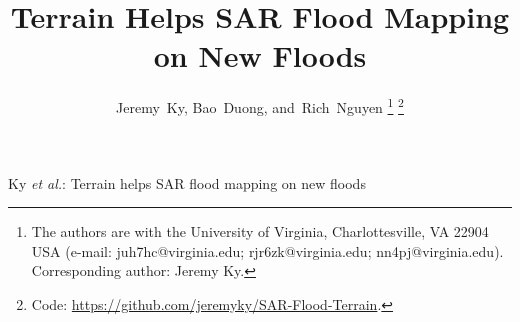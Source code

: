 \documentclass[journal]{IEEEtran}
\begin{document}

\title{Terrain Helps SAR Flood Mapping on New Floods}

\author{Jeremy~Ky, Bao~Duong, and~Rich~Nguyen%
\thanks{The authors are with the University of Virginia, Charlottesville, VA 22904 USA (e-mail:
juh7hc@virginia.edu; rjr6zk@virginia.edu; nn4pj@virginia.edu). Corresponding author: Jeremy Ky.}%
\thanks{Code: \url{https://github.com/jeremyky/SAR-Flood-Terrain}.}}

%
{Ky \MakeLowercase{\textit{et al.}}: Terrain helps SAR flood mapping on new floods}

\maketitle












\end{document}
